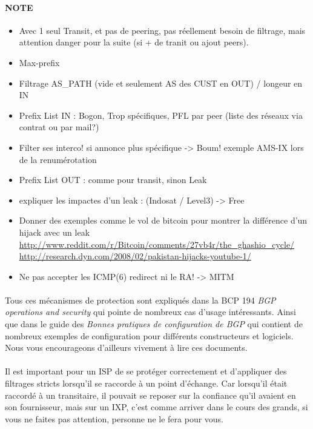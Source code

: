 \paragraph{NOTE}
\begin{itemize}
\item Avec 1 seul Transit, et pas de peering, pas réellement besoin de filtrage, mais attention danger pour la suite (si + de tranit ou ajout peers).
\item Max-prefix
\item Filtrage AS\_PATH (vide et seulement AS des CUST en OUT) / longeur en IN
\item Prefix List IN  : Bogon, Trop spécifiques, PFL par peer (liste des réseaux via contrat ou par mail?)
\item Filter ses interco! si annonce plus spécifique -> Boum! exemple AMS-IX lors de la renumérotation
\item Prefix List OUT : comme pour transit, sinon Leak
\item expliquer les impactes d'un leak :  (Indosat / Level3) -> Free
\item Donner des exemples comme le vol de bitcoin pour montrer la différence d'un hijack avec un leak
\url{http://www.reddit.com/r/Bitcoin/comments/27vb4r/the_ghashio_cycle/}
\url{http://research.dyn.com/2008/02/pakistan-hijacks-youtube-1/}
\item Ne pas accepter les ICMP(6) redirect ni le RA! -> MITM
\end{itemize}

\paragraph{}
Tous ces mécanismes de protection sont expliqués dans la BCP 194 \emph{BGP operations and security} \cite{fenioux:BGPOPSEC} qui pointe de nombreux cas d'usage intéressants. Ainsi que dans le guide des \emph{Bonnes pratiques de configuration de BGP} \cite{fenioux:ANSSIBGP} qui contient de nombreux exemples de configuration pour différents constructeurs et logiciels. Nous vous encourageons d'ailleurs vivement à lire ces documents.

\paragraph{}
Il est important pour un ISP de se protéger correctement et d'appliquer des filtrages stricts lorsqu'il se raccorde à un point d'échange.
Car lorsqu'il était raccordé à un transitaire, il pouvait se reposer sur la confiance qu'il avaient en son fournisseur, mais sur un IXP, c'est comme arriver dans le cours des grands, si vous ne faites pas attention, personne ne le fera pour vous.

